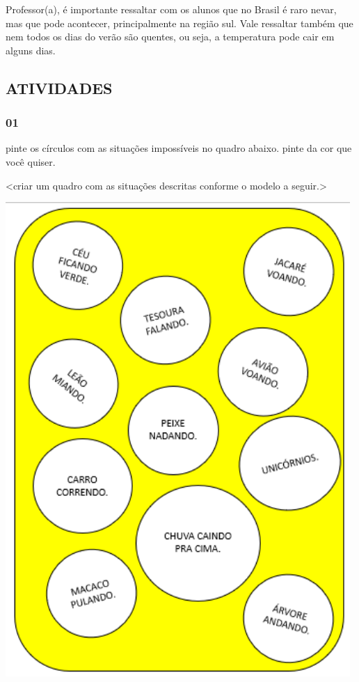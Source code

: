 Professor(a), é importante ressaltar com os alunos que no Brasil é raro
nevar, mas que pode acontecer, principalmente na região sul. Vale
ressaltar também que nem todos os dias do verão são quentes, ou seja, a
temperatura pode cair em alguns dias.

\subsection{ATIVIDADES}\label{atividades-5}

\subsubsection{01}\label{section-63}

pinte os círculos com as situações impossíveis no quadro abaixo. pinte
da cor que você quiser.

\textless{}criar um quadro com as situações descritas conforme o modelo
a seguir.\textgreater{}

\includegraphics[width=5.16074in,height=7.09420in]{media/image80.png}

